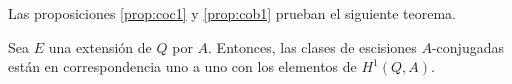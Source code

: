 
Las proposiciones \ref{prop:coc1} y \ref{prop:cob1} prueban el siguiente teorema.
\begin{teorema}\label{h1}
	Sea $E$ una extensión de $Q$ por $A$. Entonces, las clases de escisiones $A$-conjugadas están en correspondencia uno a uno con los elementos de $H^1(Q,A)$.
\end{teorema}

